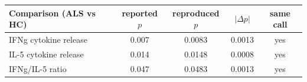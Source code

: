 \begin{tabular}{p{5.0cm}cccc}
\toprule
Comparison (ALS vs HC) & reported $p$ & reproduced $p$ & $|\Delta p|$ & same call \\
\midrule
IFNg cytokine release & 0.007 & 0.0083 & 0.0013 & yes \\
IL-5 cytokine release & 0.014 & 0.0148 & 0.0008 & yes \\
IFNg/IL-5 ratio & 0.047 & 0.0483 & 0.0013 & yes \\
\bottomrule
\end{tabular}
